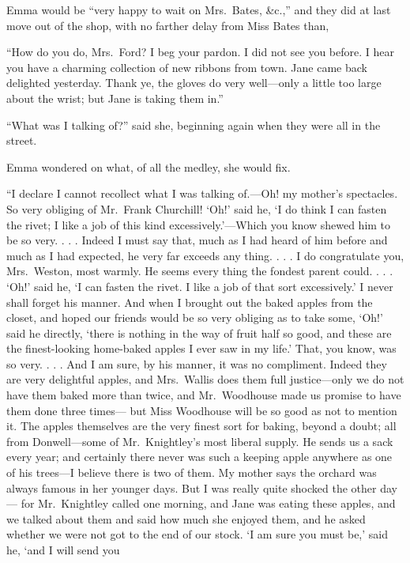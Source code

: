 Emma would be ``very happy to wait on Mrs.\ Bates, \&c.,'' and they
did at last move out of the shop, with no farther delay from Miss
Bates than,

``How do you do, Mrs.\ Ford?  I beg your pardon.  I did not see
you before.  I hear you have a charming collection of new ribbons
from town.  Jane came back delighted yesterday.  Thank ye,
the gloves do very well---only a little too large about the wrist;
but Jane is taking them in.''

``What was I talking of?'' said she, beginning again when they were
all in the street.

Emma wondered on what, of all the medley, she would fix.

``I declare I cannot recollect what I was talking of.---Oh! my
mother's spectacles.  So very obliging of Mr.\ Frank Churchill!
`Oh!' said he, `I do think I can fasten the rivet; I like a job
of this kind excessively.'---Which you know shewed him to be so
very. . . . Indeed I must say that, much as I had heard of him
before and much as I had expected, he very far exceeds any
thing. . . . I do congratulate you, Mrs.\ Weston, most warmly.
He seems every thing the fondest parent could. . . . `Oh!' said he,
`I can fasten the rivet.  I like a job of that sort excessively.'
I never shall forget his manner.  And when I brought out the baked
apples from the closet, and hoped our friends would be so very
obliging as to take some, `Oh!' said he directly, `there is nothing
in the way of fruit half so good, and these are the finest-looking
home-baked apples I ever saw in my life.'  That, you know, was so
very. . . . And I am sure, by his manner, it was no compliment.
Indeed they are very delightful apples, and Mrs.\ Wallis does them
full justice---only we do not have them baked more than twice,
and Mr.\ Woodhouse made us promise to have them done three times---%
but Miss Woodhouse will be so good as not to mention it.  The apples
themselves are the very finest sort for baking, beyond a doubt;
all from Donwell---some of Mr.\ Knightley's most liberal supply.
He sends us a sack every year; and certainly there never was such
a keeping apple anywhere as one of his trees---I believe there
is two of them.  My mother says the orchard was always famous
in her younger days.  But I was really quite shocked the other day---%
for Mr.\ Knightley called one morning, and Jane was eating these apples,
and we talked about them and said how much she enjoyed them,
and he asked whether we were not got to the end of our stock.
`I am sure you must be,' said he, `and I will send you
